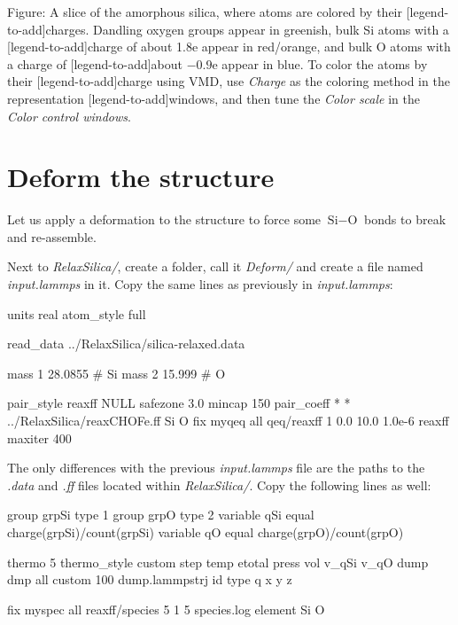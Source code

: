 \vspace{0.25cm} Figure: A slice of the amorphous silica, where atoms are colored by their
[legend-to-add]charges. Dandling oxygen groups appear in greenish, bulk Si atoms with a
[legend-to-add]charge of about 1.8e appear in red/orange, and bulk O atoms with a charge of
[legend-to-add]about $-0.9\text{e}$ appear in blue. To color the atoms by their
[legend-to-add]charge using VMD, use \textit{Charge} as the coloring method in the representation
[legend-to-add]windows, and then tune the \textit{Color scale} in the \textit{Color control windows}.

\section{Deform the structure}
\noindent Let us apply a deformation to the structure to force some
$\text{Si}-\text{O}$ bonds to break and re-assemble. 

\vspace{0.25cm} \noindent Next to \textit{RelaxSilica/}, create a folder, call it \textit{Deform/} and create a
file named \textit{input.lammps} in it. Copy the same lines as previously in
\textit{input.lammps}:

\begin{lcverbatim}
units real
atom_style full

read_data ../RelaxSilica/silica-relaxed.data

mass 1 28.0855 # Si
mass 2 15.999 # O

pair_style reaxff NULL safezone 3.0 mincap 150
pair_coeff * * ../RelaxSilica/reaxCHOFe.ff Si O
fix myqeq all qeq/reaxff 1 0.0 10.0 1.0e-6 reaxff maxiter 400
\end{lcverbatim}

\noindent The only differences with the previous \textit{input.lammps} file are the
paths to the \textit{.data} and \textit{.ff} files located within \textit{RelaxSilica/}.
Copy the following lines as well:

\begin{lcverbatim}
group grpSi type 1
group grpO type 2
variable qSi equal charge(grpSi)/count(grpSi)
variable qO equal charge(grpO)/count(grpO)

thermo 5
thermo_style custom step temp etotal press vol v_qSi v_qO
dump dmp all custom 100 dump.lammpstrj id type q x y z

fix myspec all reaxff/species 5 1 5 species.log element Si O
\end{lcverbatim}

